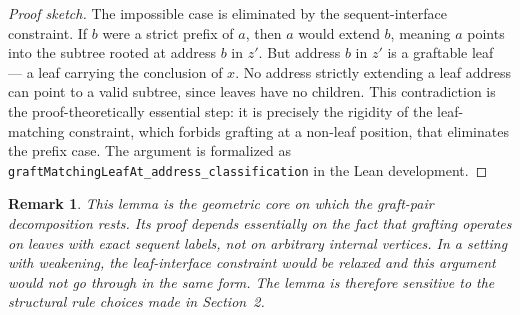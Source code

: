 \documentclass[11pt]{article}
\newtheorem{remark}[theorem]{Remark}
\begin{document}
\begin{proof}[Proof sketch]
The impossible case is eliminated by the sequent-interface constraint.
If $b$ were a strict prefix of $a$, then $a$ would extend $b$, meaning
$a$ points into the subtree rooted at address $b$ in $z'$. But address
$b$ in $z'$ is a graftable leaf --- a leaf carrying the conclusion of $x$.
No address strictly extending a leaf address can point to a valid subtree,
since leaves have no children. This contradiction is the proof-theoretically
essential step: it is precisely the rigidity of the leaf-matching constraint,
which forbids grafting at a non-leaf position, that eliminates the prefix case.
The argument is formalized as \texttt{graftMatchingLeafAt\_address\_classification}
in the Lean development.
\end{proof}

\begin{remark}
This lemma is the geometric core on which the graft-pair decomposition rests.
Its proof depends essentially on the fact that grafting operates on leaves
with exact sequent labels, not on arbitrary internal vertices. In a setting
with weakening, the leaf-interface constraint would be relaxed and this
argument would not go through in the same form. The lemma is therefore
sensitive to the structural rule choices made in Section~2.
\end{remark}
\end{document}
